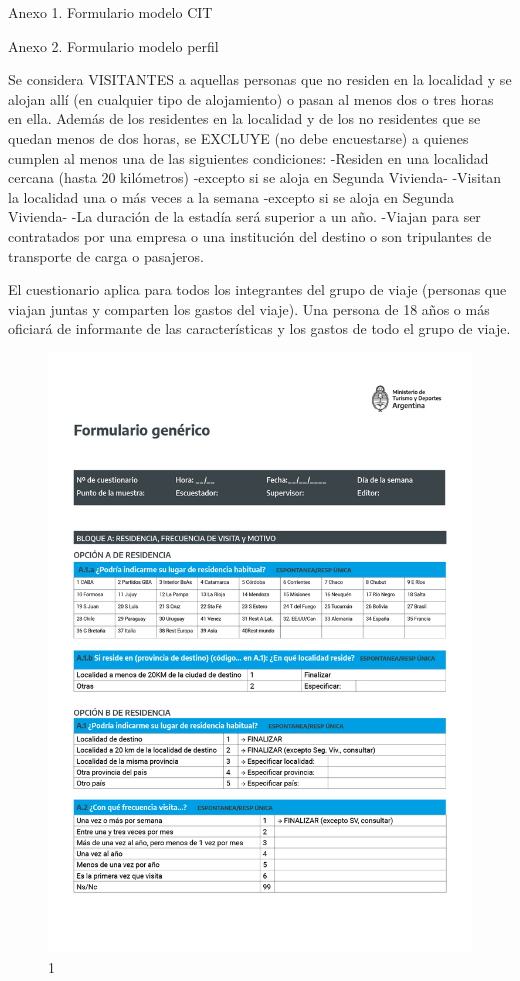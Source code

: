 \documentclass[
]{book}
\begin{document}
Anexo 1. Formulario modelo CIT

Anexo 2. Formulario modelo perfil

Se considera VISITANTES a aquellas personas que no residen en la localidad y se alojan allí (en cualquier tipo de alojamiento) o pasan al menos dos o tres horas en ella. Además de los residentes en la localidad y de los no residentes que se quedan menos de dos horas, se EXCLUYE (no debe encuestarse) a quienes cumplen al menos una de las siguientes condiciones:
-Residen en una localidad cercana (hasta 20 kilómetros) -excepto si se aloja en Segunda Vivienda-
-Visitan la localidad una o más veces a la semana -excepto si se aloja en Segunda Vivienda-
-La duración de la estadía será superior a un año.
-Viajan para ser contratados por una empresa o una institución del destino o son tripulantes de transporte de carga o pasajeros.

El cuestionario aplica para todos los integrantes del grupo de viaje (personas que viajan juntas y comparten los gastos del viaje).
Una persona de 18 años o más oficiará de informante de las características y los gastos de todo el grupo de viaje.

\begin{figure}

{\centering \includegraphics[width=1\linewidth]{imagenes/graf01} 

}

\caption{1}\label{fig:001}
\end{figure}
\end{document}
